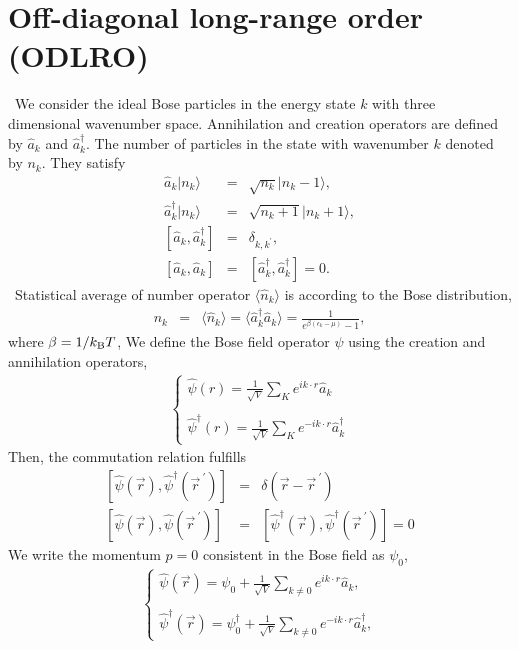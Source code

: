 \documentclass[12pt,a4paper]{report} %
\newcommand{\kb} {k_{\rm B}}				%
\begin{document}
\section{Off-diagonal long-range order (ODLRO)}
\ We consider the ideal Bose particles in the energy state $k$ with three dimensional wavenumber space.
Annihilation and creation operators are defined by $\hat{a}_{k}$ and $\hat{a}^\dagger_{k}$.
The number of particles in the state with wavenumber $k$ denoted by $n_k$. They satisfy
\begin{eqnarray}
\hat{a}_k | n_k \rangle & = & \sqrt{n_k}|n_k - 1 \rangle,
\\
\hat{a}^\dagger_k | n_k \rangle & = & \sqrt{n_k+1} | n_k + 1 \rangle,
\\
\left[ \hat{a}_k, \hat{a}^\dagger_k \right] & = & \delta_{k,k^\prime},
\\
\left[ \hat{a}_k, \hat{a}_k \right] & = & \left[ \hat{a}^\dagger_k, \hat{a}^\dagger_k \right] = 0.
\end{eqnarray}
\ Statistical average of number operator $\langle \hat{n}_k \rangle$ 
is according to the Bose distribution,
\begin{eqnarray}
n_k & = & \langle \hat{n}_k \rangle = \langle \hat{a}^\dagger_k \hat{a}_k \rangle = \frac{1}{e^{\beta(\epsilon_k - \mu)} - 1},
\end{eqnarray}
where $\beta = 1/\kb T$,
We define the Bose field operator $\psi$ using the creation and annihilation operators,
\begin{eqnarray}
\left \{
\begin{array}{l}
\hat{\psi} (r) = \frac{1}{\sqrt{V}} \sum_K e^{i k \cdot r} \hat{a}_k
\\
\\
\hat{\psi}^\dagger (r) = \frac{1}{\sqrt{V}} \sum_K e^{-i k \cdot r} \hat{a}^\dagger_k
\end{array}
\right.
\end{eqnarray}
Then, the commutation relation fulfills
\begin{eqnarray}
\left[ \hat{\psi}(\vec{r}), \hat{\psi}^\dagger(\vec{r}^{\ \prime} ) \right] & = & \delta( \vec{r} - \vec{r}^{\ \prime} )
\\
\left[ \hat{\psi}(\vec{r}), \hat{\psi}(\vec{r}^{\ \prime} ) \right] & = & 
\left[ \hat{\psi}^\dagger(\vec{r}), \hat{\psi}^\dagger(\vec{r}^{\ \prime} ) \right] = 0
\end{eqnarray}
We write the momentum $p=0$ consistent in the Bose field as $\psi_0$,
\begin{eqnarray}
\left \{
\begin{array}{l}
\hat{\psi}(\vec{r}) = \psi_0 + \frac{1}{\sqrt{V}} \sum_{k \neq 0} e^{i k \cdot r} \hat{a}_k,
\\
\\
\hat{\psi}^\dagger(\vec{r}) = \psi^\dagger_0 + \frac{1}{\sqrt{V}} \sum_{k \neq 0} e^{-i k \cdot r} \hat{a}^\dagger_k,
\end{array}
\right.
\end{eqnarray}
\end{document}
